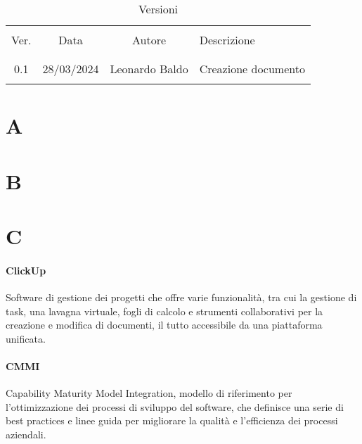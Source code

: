 \documentclass[italian,12pt]{article} %
\newcommand{\glossdef}[2]{\paragraph{#1}#2}
\begin{document}


\newpage



\begin{table}[!h]
	\caption{Versioni}
	\begin{center}
		\begin{tabular}{ c c c p{9cm} }
			\hline                                                   \\[-2ex]
			Ver. & Data       & Autore         & Descrizione         \\
			\\[-2ex] \hline \\[-1.5ex]
			0.1  & 28/03/2024 & Leonardo Baldo & Creazione documento \\
			\\[-1.5ex] \hline
		\end{tabular}
	\end{center}
\end{table}

\newpage

\tableofcontents


\newpage

\section{A}



\newpage

\section{B}



\newpage

\section{C}
\glossdef{ClickUp}{Software di gestione dei progetti che offre varie funzionalità, tra cui la gestione di task, una lavagna virtuale, fogli di calcolo e strumenti collaborativi per la creazione e modifica di documenti, il tutto accessibile da una piattaforma unificata.
}
\glossdef{CMMI}{Capability Maturity Model Integration, modello di riferimento per l'ottimizzazione dei processi di sviluppo del software, che definisce una serie di best practices e linee guida per migliorare la qualità e l'efficienza dei processi aziendali.
}
\end{document}

